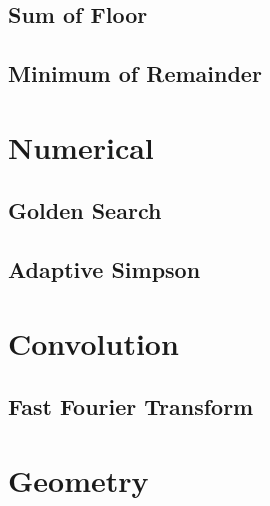 \documentclass{article}
\begin{document}
\begin{multicols}{2}
    \subsection{Sum of Floor}
    
    \subsection{Minimum of Remainder}
    
    

    \section{Numerical}
    \subsection{Golden Search}
    
    \subsection{Adaptive Simpson}
    
    

    \section{Convolution}
    \subsection{Fast Fourier Transform}
    

    \section{Geometry}
    
\end{multicols}
\end{document}
